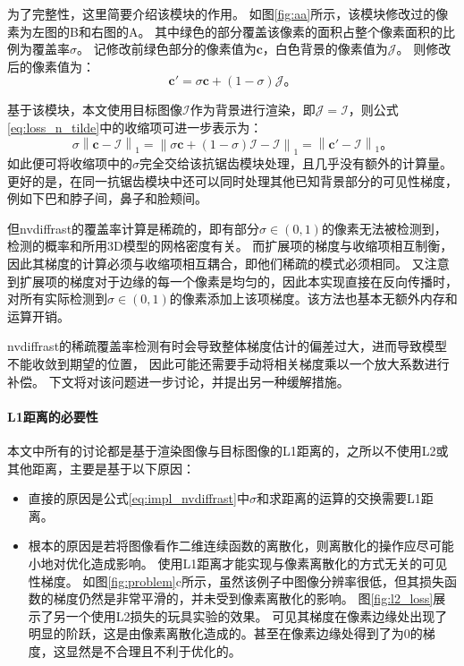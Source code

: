 为了完整性，这里简要介绍该模块的作用。
如图\ref{fig:aa}所示，该模块修改过的像素为左图的B和右图的A。
其中绿色的部分覆盖该像素的面积占整个像素面积的比例为覆盖率$\sigma$。
记修改前绿色部分的像素值为$\mathbf{c}$，白色背景的像素值为$\mathcal{J}$。
则修改后的像素值为：
\begin{equation}
\mathbf{c}' = \sigma\mathbf{c} + (1-\sigma)\mathcal{J}
\text{。}
\end{equation}

基于该模块，本文使用目标图像$\mathcal{I}$作为背景进行渲染，即$\mathcal{J}=\mathcal{I}$，则公式\ref{eq:loss_n_tilde}中的收缩项可进一步表示为：
\begin{equation}
\sigma\left\| \mathbf{c} - \mathcal{I} \right\|_1 =
\left\| \sigma\mathbf{c} + (1-\sigma)\mathcal{I} - \mathcal{I} \right\|_1 =
\left\| \mathbf{c}' - \mathcal{I} \right\|_1
\text{。}
\label{eq:impl_nvdiffrast}
\end{equation}
如此便可将收缩项中的$\sigma$完全交给该抗锯齿模块处理，且几乎没有额外的计算量。
更好的是，在同一抗锯齿模块中还可以同时处理其他已知背景部分的可见性梯度，例如下巴和脖子间，鼻子和脸颊间。

但nvdiffrast的覆盖率计算是稀疏的，即有部分$\sigma\in(0,1)$的像素无法被检测到，检测的概率和所用3D模型的网格密度有关。
而扩展项的梯度与收缩项相互制衡，因此其梯度的计算必须与收缩项相互耦合，即他们稀疏的模式必须相同。
又注意到扩展项的梯度对于边缘的每一个像素是均匀的，因此本实现直接在反向传播时，对所有实际检测到$\sigma\in(0,1)$的像素添加上该项梯度。该方法也基本无额外内存和运算开销。

nvdiffrast的稀疏覆盖率检测有时会导致整体梯度估计的偏差过大，进而导致模型不能收敛到期望的位置，
因此可能还需要手动将相关梯度乘以一个放大系数进行补偿。
下文将对该问题进一步讨论，并提出另一种缓解措施。

\paragraph{L1距离的必要性}
本文中所有的讨论都是基于渲染图像与目标图像的L1距离的，之所以不使用L2或其他距离，主要是基于以下原因：
\begin{itemize}
\item 直接的原因是公式\ref{eq:impl_nvdiffrast}中$\sigma$和求距离的运算的交换需要L1距离。
\item 根本的原因是若将图像看作二维连续函数的离散化，则离散化的操作应尽可能小地对优化造成影响。
使用L1距离才能实现与像素离散化的方式无关的可见性梯度。
如图\ref{fig:problem}c所示，虽然该例子中图像分辨率很低，但其损失函数的梯度仍然是非常平滑的，并未受到像素离散化的影响。
图\ref{fig:l2_loss}展示了另一个使用L2损失的玩具实验的效果。
可见其梯度在像素边缘处出现了明显的阶跃，这是由像素离散化造成的。甚至在像素边缘处得到了为0的梯度，这显然是不合理且不利于优化的。
\end{itemize}

